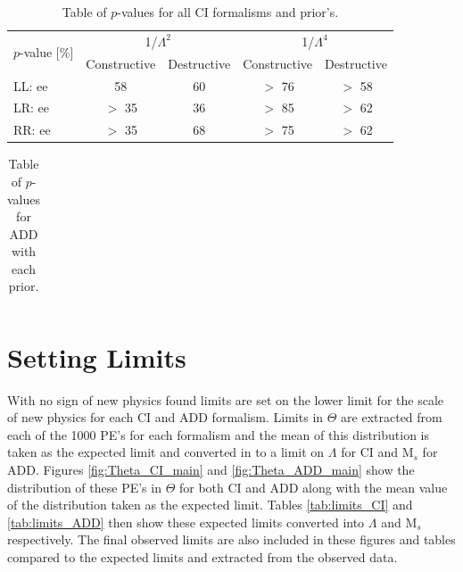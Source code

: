     \begin {table}[h]
        \begin{center}
        \begin{tabular}{ | l | c | c | c | c | } 
            \hline
            \multirow{2}{*}{$p$-value [\%]} & \multicolumn{2}{c|}{1/$\Lambda^2$} & \multicolumn{2}{c|}{1/$\Lambda^4$} \\
            \cline{2-5}
            & Constructive & Destructive & Constructive & Destructive \\
            \hline
            LL: ee & 58 & 60 & $>$ 76 & $>$ 58 \\
            LR: ee & $>$ 35 & 36 & $>$ 85 & $>$ 62 \\
            RR: ee & $>$ 35 & 68 & $>$ 75 & $>$ 62 \\
            \hline
        \end{tabular}
        \caption{Table of $p$-values for all CI formalisms and prior's.}
        \label{tab:pvalue_CI}
        \end{center}
    \end {table}


    \begin {table}[h]
        \begin{center}
        \begin{tabular}{ | l | c | c | c | } 
            \hline
            
            \hline
        \end{tabular}
        \caption{Table of $p$-values for ADD with each prior.}
        \label{tab:pvalue_ADD}
        \end{center}
    \end {table}






\section{Setting Limits}
    
    With no sign of new physics found limits are set on the lower limit for the scale of new physics for each CI and ADD formalism. Limits in $\Theta$ are extracted from each of the 1000 PE's for each formalism and the mean of this distribution is taken as the expected limit and converted in to a limit on $\Lambda$ for CI and M$_{s}$ for ADD. Figures \ref{fig:Theta_CI_main} and \ref{fig:Theta_ADD_main} show the distribution of these PE's in $\Theta$ for both CI and ADD along with the mean value of the distribution taken as the expected limit. Tables \ref{tab:limits_CI} and \ref{tab:limits_ADD} then show these expected limits converted into $\Lambda$ and M$_{s}$ respectively. The final observed limits are also included in these figures and tables compared to the expected limits and extracted from the observed data. 


